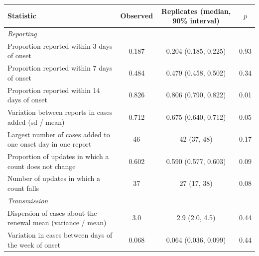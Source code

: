 \begin{tabular}{lccc}
\toprule
Statistic & Observed & Replicates (median, 90\% interval) & $p$ \\
\midrule
\emph{Reporting} \\
Proportion reported within 3 days of onset & 0.187 & 0.204 (0.185, 0.225) & 0.93 \\
Proportion reported within 7 days of onset & 0.484 & 0.479 (0.458, 0.502) & 0.34 \\
Proportion reported within 14 days of onset & 0.826 & 0.806 (0.790, 0.822) & 0.01 \\
Variation between reports in cases added (sd / mean) & 0.712 & 0.675 (0.640, 0.712) & 0.05 \\
Largest number of cases added to one onset day in one report & 46 & 42 (37, 48) & 0.17 \\
Proportion of updates in which a count does not change & 0.602 & 0.590 (0.577, 0.603) & 0.09 \\
Number of updates in which a count falls & 37 & 27 (17, 38) & 0.08 \\
\addlinespace
\emph{Transmission} \\
Dispersion of cases about the renewal mean (variance / mean) & 3.0 & 2.9 (2.0, 4.5) & 0.44 \\
Variation in cases between days of the week of onset & 0.068 & 0.064 (0.036, 0.099) & 0.44 \\
\bottomrule
\end{tabular}
